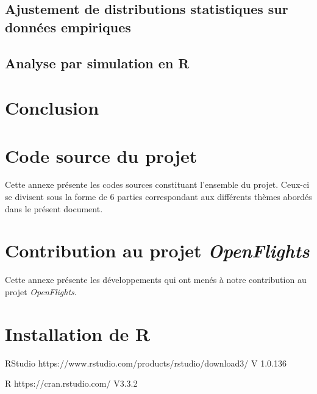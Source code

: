 \documentclass{report}
\begin{document}
\section{Ajustement de distributions statistiques sur données empiriques}
	

\section{Analyse par simulation en R}
	
	
\chapter*{Conclusion}
	




\appendix
\chapter{Code source du projet}
	\label{ann:srcProject}
Cette annexe présente les codes sources constituant l'ensemble du projet. Ceux-ci se divisent sous la forme de 6 parties correspondant aux différents thèmes abordés dans le présent document. \\

	\label{src:benchmark}

	\label{src:caseStudy1}

	\label{src:caseStudy2}

	\label{src:caseStudy3}

	\label{src:caseStudy4}

	\label{src:caseStudy5}

	\label{src:caseStudy6}

\chapter{Contribution au projet \emph{OpenFlights}}
	\label{ann:contribOpenFlights}
Cette annexe présente les développements qui ont menés à notre contribution au projet \emph{OpenFlights}.
	

	\label{src:tzFormatRefill}
	
\chapter{Installation de R}
	\label{ann:getStarted}
RStudio
https://www.rstudio.com/products/rstudio/download3/
V 1.0.136

R
https://cran.rstudio.com/
V3.3.2
\end{document}
